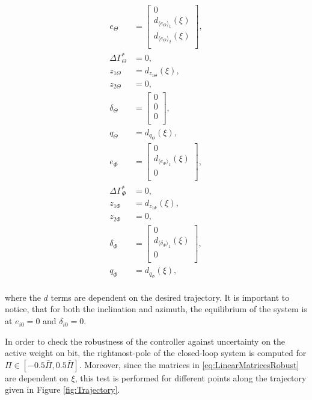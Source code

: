 \documentclass[../main.tex]{subfiles}
\begin{document}
 \begin{align}
 	e_\Theta &= \begin{bmatrix}
 	0 \\
 	d_{\langle e_\Theta \rangle_1}(\xi) \\
 	d_{\langle e_\Theta \rangle_2}(\xi) \\
 	\end{bmatrix}, \nonumber \\
 	\Delta \Gamma_{\Theta}^* &= 0, \nonumber \\
 	z_{1\Theta} &= d_{z_{1\Theta}}(\xi) , \nonumber \\
 	z_{2\Theta} &= 0, \nonumber \\
 	\delta_\Theta &= \begin{bmatrix}
 	0 \\
 	0 \\
 	0 \\
 	\end{bmatrix}, \nonumber \\
 	q_{\Theta} &= d_{q_\Theta}(\xi) , \nonumber \\
 	e_\Phi &= \begin{bmatrix}
 	0 \\
 	d_{\langle e_\Phi \rangle_1}(\xi) \\
 	0 \\
 	\end{bmatrix}, \nonumber \\
 	\Delta \Gamma_{\Phi}^* &= 0, \nonumber \\
 	z_{1\Phi} &= d_{z_{1\Phi}}(\xi) , \nonumber \\
 	z_{2\Phi} &= 0, \nonumber \\
 	\delta_\Phi &= \begin{bmatrix}
 	0 \\
 	d_{\langle \delta_\Phi \rangle_1}(\xi) \\
 	0 \\
 	\end{bmatrix}, \nonumber \\
 	q_{\Phi} &= d_{q_\Phi}(\xi) , \nonumber \label{eq:linearizationpointrobust} \\
 \end{align}
 
 where the $d$ terms are dependent on the desired trajectory. It is important to notice, that for both the inclination and azimuth, the equilibrium of the system is at $e_{i0} = 0$ and $\delta_{i0} = 0$. 
 
 In order to check the robustness of the controller against uncertainty on the active weight on bit, the rightmost-pole of the closed-loop system is computed for  $\Pi \in [-0.5\bar{\Pi},0.5\bar{\Pi}]$. Moreover, since the matrices in \eqref{eq:LinearMatricesRobust} are dependent on $\xi$, this test is performed for different points along the trajectory given in Figure \ref{fig:Trajectory}.
 
\end{document}

